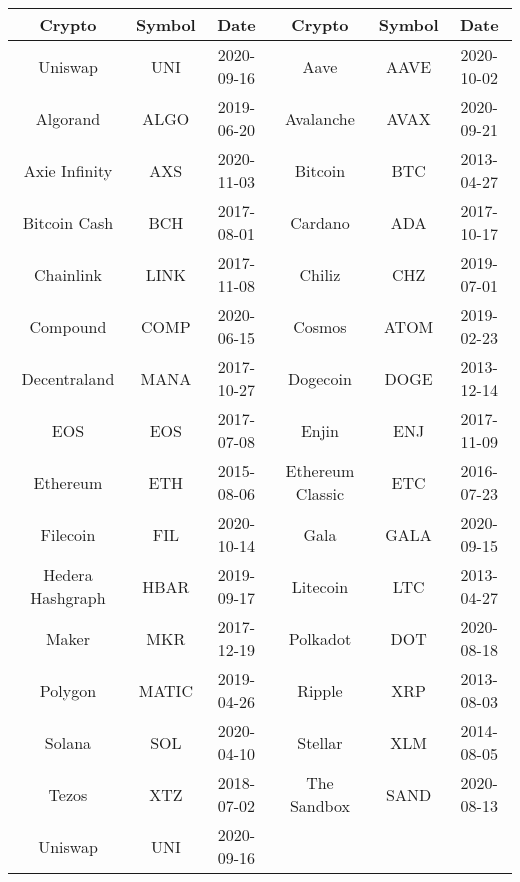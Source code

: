 \begin{tabular}{cccccc}
\toprule
Crypto & Symbol & Date & Crypto & Symbol & Date\\
\midrule
Uniswap & UNI & 2020-09-16 & Aave & AAVE & 2020-10-02\\
Algorand & ALGO & 2019-06-20 & Avalanche & AVAX & 2020-09-21\\
Axie Infinity & AXS & 2020-11-03 & Bitcoin & BTC & 2013-04-27\\
Bitcoin Cash & BCH & 2017-08-01 & Cardano & ADA & 2017-10-17\\
Chainlink & LINK & 2017-11-08 & Chiliz & CHZ & 2019-07-01\\
Compound & COMP & 2020-06-15 & Cosmos & ATOM & 2019-02-23\\
Decentraland & MANA & 2017-10-27 & Dogecoin & DOGE & 2013-12-14\\
EOS & EOS & 2017-07-08 & Enjin & ENJ & 2017-11-09\\
Ethereum & ETH & 2015-08-06 & Ethereum Classic & ETC & 2016-07-23\\
Filecoin & FIL & 2020-10-14 & Gala & GALA & 2020-09-15\\
Hedera Hashgraph & HBAR & 2019-09-17 & Litecoin & LTC & 2013-04-27\\
Maker & MKR & 2017-12-19 & Polkadot & DOT & 2020-08-18\\
Polygon & MATIC & 2019-04-26 & Ripple & XRP & 2013-08-03\\
Solana & SOL & 2020-04-10 & Stellar & XLM & 2014-08-05\\
Tezos & XTZ & 2018-07-02 & The Sandbox & SAND & 2020-08-13\\
Uniswap & UNI & 2020-09-16 & & &\\
\bottomrule
\end{tabular}
